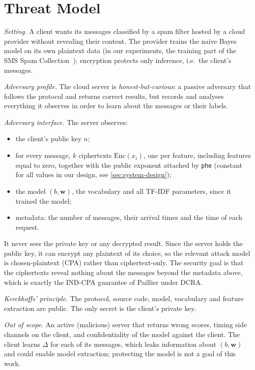 \section{Threat Model}\label{sec:threat-model}

\textit{Setting.}
A client wants its messages classified by a spam filter hosted by a cloud provider without revealing their content.
The provider trains the naive Bayes model on its own plaintext data (in our experiments, the training part of the SMS Spam Collection~\cite{smsspam}); encryption protects only inference, i.e.\ the client's messages.

\textit{Adversary profile.}
The cloud server is \emph{honest-but-curious}: a passive adversary that follows the protocol and returns correct results, but records and analyses everything it observes in order to learn about the messages or their labels.

\textit{Adversary interface.}
The server observes:
\begin{itemize}
  \item the client's public key $n$;
  \item for every message, $k$ ciphertexts $\mathrm{Enc}(x_i)$, one per feature, including features equal to zero, together with the public exponent attached by \texttt{phe} (constant for all values in our design, see \cref{sec:system-design});
  \item the model $(b, \mathbf{w})$, the vocabulary and all TF-IDF parameters, since it trained the model;
  \item metadata: the number of messages, their arrival times and the time of each request.
\end{itemize}
It never sees the private key or any decrypted result.
Since the server holds the public key, it can encrypt any plaintext of its choice, so the relevant attack model is chosen-plaintext (CPA) rather than ciphertext-only.
The security goal is that the ciphertexts reveal nothing about the messages beyond the metadata above, which is exactly the IND-CPA guarantee of Paillier under DCRA.

\textit{Kerckhoffs' principle.}
The protocol, source code, model, vocabulary and feature extraction are public.
The only secret is the client's private key.

\textit{Out of scope.}
An active (malicious) server that returns wrong scores, timing side channels on the client, and confidentiality of the model against the client.
The client learns $\Delta$ for each of its messages, which leaks information about $(b, \mathbf{w})$ and could enable model extraction; protecting the model is not a goal of this work.

